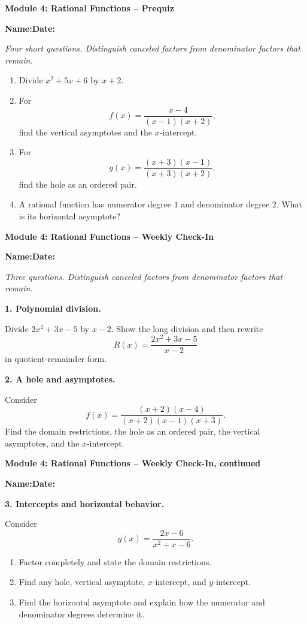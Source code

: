 \documentclass[11pt]{article}
\newcommand{\assessmenttitle}[2]{%
  {\Large\bfseries Module #1: #2}\par\vspace{3pt}
}
\newcommand{\studentline}{%
\noindent\textbf{Name:}\hspace{2.6in}\textbf{Date:}\hspace{1.15in}\par\vspace{7pt}}
\newcommand{\directions}[1]{\textit{#1}\par\vspace{4pt}}
\newcommand{\answerblank}[1]{\vspace{#1}}
\begin{document}
\assessmenttitle{4}{Rational Functions -- Prequiz}
\studentline
\directions{Four short questions. Distinguish canceled factors from denominator factors that remain.}
\begin{enumerate}
\item Divide $x^2+5x+6$ by $x+2$.
\answerblank{0.52in}
\item For
\[
f(x)=\frac{x-4}{(x-1)(x+2)},
\]
find the vertical asymptotes and the $x$-intercept.
\answerblank{0.58in}
\item For
\[
g(x)=\frac{(x+3)(x-1)}{(x+3)(x+2)},
\]
find the hole as an ordered pair.
\answerblank{0.65in}
\item A rational function has numerator degree $1$ and denominator degree $2$. What is its horizontal asymptote?
\answerblank{0.42in}
\end{enumerate}
\newpage

\assessmenttitle{4}{Rational Functions -- Weekly Check-In}
\studentline
\directions{Three questions. Distinguish canceled factors from denominator factors that remain.}
\textbf{1. Polynomial division.}

Divide $2x^2+3x-5$ by $x-2$. Show the long division and then rewrite
\[
R(x)=\frac{2x^2+3x-5}{x-2}
\]
in quotient-remainder form.
\answerblank{2.25in}

\textbf{2. A hole and asymptotes.}

Consider
\[
f(x)=\frac{(x+2)(x-4)}{(x+2)(x-1)(x+3)}.
\]
Find the domain restrictions, the hole as an ordered pair, the vertical asymptotes, and the $x$-intercept.
\answerblank{1.35in}
\newpage

\assessmenttitle{4}{Rational Functions -- Weekly Check-In, continued}
\studentline
\textbf{3. Intercepts and horizontal behavior.}

Consider
\[
g(x)=\frac{2x-6}{x^2+x-6}.
\]
\begin{enumerate}[label=(\alph*),leftmargin=0.35in]
\item Factor completely and state the domain restrictions.
\answerblank{0.60in}
\item Find any hole, vertical asymptote, $x$-intercept, and $y$-intercept.
\answerblank{1.20in}
\item Find the horizontal asymptote and explain how the numerator and denominator degrees determine it.
\answerblank{0.90in}
\end{enumerate}
\end{document}
